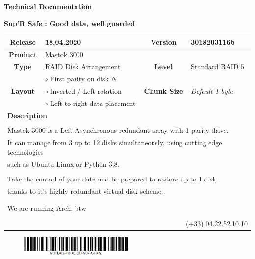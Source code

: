 \documentclass[cn,normal,black,11pt]{elegantnote}
\begin{document}
\centerline{\textbf{\huge{ Technical Documentation }}}
\centerline{\textbf{Sup'R Safe : Good data, well guarded }}

\begin{table}[htbp]
    \centering
    \begin{tabular}{|c|p{6cm}|c|p{4cm}|}
        \hline
        \textbf{Release} & 18.04.2020 & \textbf{Version} & 3018203116b  \\ \hline
         \textbf{Product} & \multicolumn{3}{l|}{Mastok 3000} \\ 
         \hline
         \textbf{Type} & RAID Disk Arrangement & \textbf{Level} & Standard RAID 5 \\ \hline
         \multirow{3}{*}{\textbf{Layout}} & $\circ$ First parity on disk \(N\) & \multirow{3}{*}{\textbf{Chunk Size}} &  \\
         & $\circ$ Inverted / Left rotation &  & \textit{Default 1 byte} \\
         &  $\circ$ Left-to-right data placement &  &  \\ \hline
         \multicolumn{4}{|l|}{\textbf{Description}} \\
         \multicolumn{4}{|l|}{ }\\
         \multicolumn{4}{|l|}{Mastok 3000 is a Left-Asynchronous redundant array with 1 parity drive.}\\
         \multicolumn{4}{|l|}{It can manage from 3 up to 12 disks simultaneously, using cutting edge technologies }\\
         \multicolumn{4}{|l|}{such as Ubuntu Linux or Python 3.8.}\\
         \multicolumn{4}{|l|}{ }\\
         \multicolumn{4}{|l|}{Take the control of your data and be prepared to restore up to 1 disk}\\
         \multicolumn{4}{|l|}{thanks to it's highly redundant virtual disk scheme.}\\
         \multicolumn{4}{|l|}{ }\\
         \multicolumn{4}{|l|}{ } \\
         \multicolumn{4}{|l|}{ We are running Arch, btw }\\
         \multicolumn{4}{|l|}{ }\\
         \multicolumn{4}{|r|}{(+33) 04.22.52.10.10} \\ \hline
    \end{tabular}
\end{table}
\begin{flushright}
    \begin{figure}[htbp]
    \centering
    \includegraphics[width=0.5\textwidth]{image/barcode.jpg}
\end{figure}
\end{flushright}
\end{document}
